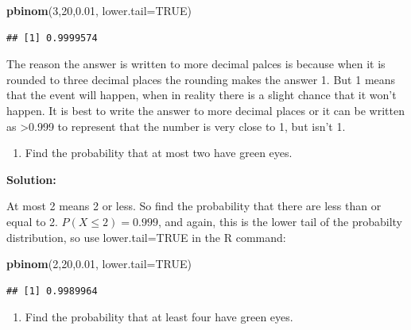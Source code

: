 \documentclass[]{book}
\newenvironment{Shaded}{\begin{snugshade}}{\end{snugshade}}
\newcommand{\DataTypeTok}[1]{\textcolor[rgb]{0.13,0.29,0.53}{#1}}
\newcommand{\DecValTok}[1]{\textcolor[rgb]{0.00,0.00,0.81}{#1}}
\newcommand{\FloatTok}[1]{\textcolor[rgb]{0.00,0.00,0.81}{#1}}
\newcommand{\KeywordTok}[1]{\textcolor[rgb]{0.13,0.29,0.53}{\textbf{#1}}}
\newcommand{\NormalTok}[1]{#1}
\newcommand{\OtherTok}[1]{\textcolor[rgb]{0.56,0.35,0.01}{#1}}
\providecommand{\tightlist}{%
  \setlength{\itemsep}{0pt}\setlength{\parskip}{0pt}}
\begin{document}
\begin{Shaded}
\begin{Highlighting}[]
\KeywordTok{pbinom}\NormalTok{(}\DecValTok{3}\NormalTok{,}\DecValTok{20}\NormalTok{,}\FloatTok{0.01}\NormalTok{, }\DataTypeTok{lower.tail=}\OtherTok{TRUE}\NormalTok{)}
\end{Highlighting}
\end{Shaded}

\begin{verbatim}
## [1] 0.9999574
\end{verbatim}

The reason the answer is written to more decimal palces is because when it is rounded to three decimal places the rounding makes the answer 1. But 1 means that the event will happen, when in reality there is a slight chance that it won't happen. It is best to write the answer to more decimal places or it can be written as \textgreater{}0.999 to represent that the number is very close to 1, but isn't 1.

\begin{enumerate}
\def\labelenumi{\alph{enumi}.}
\setcounter{enumi}{5}
\tightlist
\item
  Find the probability that at most two have green eyes.
\end{enumerate}

\textbf{Solution:}

At most 2 means 2 or less. So find the probability that there are less than or equal to 2. \(P(X \le 2)=0.999\), and again, this is the lower tail of the probabilty distribution, so use lower.tail=TRUE in the R command:

\begin{Shaded}
\begin{Highlighting}[]
\KeywordTok{pbinom}\NormalTok{(}\DecValTok{2}\NormalTok{,}\DecValTok{20}\NormalTok{,}\FloatTok{0.01}\NormalTok{, }\DataTypeTok{lower.tail=}\OtherTok{TRUE}\NormalTok{)}
\end{Highlighting}
\end{Shaded}

\begin{verbatim}
## [1] 0.9989964
\end{verbatim}

\begin{enumerate}
\def\labelenumi{\alph{enumi}.}
\setcounter{enumi}{6}
\tightlist
\item
  Find the probability that at least four have green eyes.
\end{enumerate}
\end{document}

